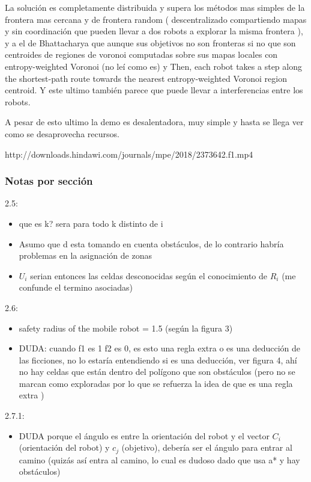 La solución es completamente distribuida y supera los métodos mas simples de la frontera mas cercana y de frontera random ( descentralizado compartiendo mapas y sin coordinación que pueden llevar a dos robots a explorar la misma frontera ), y a el de Bhattacharya que aunque sus objetivos no son fronteras si no que son centroides de regiones de voronoi computadas sobre sus mapas locales con entropy-weighted Voronoi (no leí como es) y Then, each robot takes a step along the shortest-path route towards the nearest entropy-weighted Voronoi region centroid. Y este ultimo también parece que puede llevar a interferencias entre los robots.

A pesar de esto ultimo la demo es desalentadora, muy simple y hasta se llega ver como se desaprovecha recursos.

http://downloads.hindawi.com/journals/mpe/2018/2373642.f1.mp4

\subsubsection{Notas por sección}
2.5:
\begin{itemize}
  \item que es k? sera para todo k distinto de i
  \item  Asumo que d esta tomando en cuenta obstáculos, de lo contrario habría problemas en la asignación de zonas
  \item  $U_i$ serian entonces las celdas desconocidas según el conocimiento de $R_i$ (me confunde el termino asociadas)
\end{itemize}

2.6:
\begin{itemize}
  \item safety radius of the mobile robot = 1.5 (según la figura 3)
  \item DUDA: cuando f1 es 1 f2 es 0, es esto una regla extra o es una deducción de las ficciones, no lo estaría entendiendo si es una deducción, ver figura 4, ahí no hay celdas que están dentro del polígono que son obstáculos (pero no se marcan como exploradas por lo que se refuerza la idea de que es una regla extra )
\end{itemize}

2.7.1:
\begin{itemize}
\item DUDA porque el ángulo es entre la orientación del robot y el vector $C_i$ (orientación del robot) y $c_j$ (objetivo), debería ser el ángulo para entrar al camino (quizás así entra al camino, lo cual es dudoso dado que usa a* y hay obstáculos)
\end{itemize}

